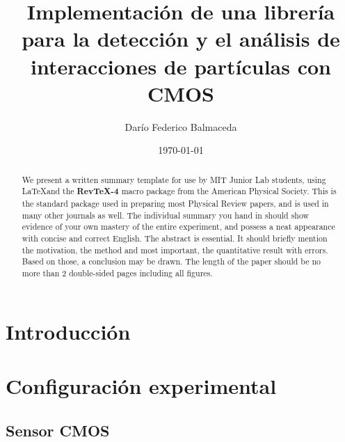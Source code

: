     
    \title{Implementación de una librería para la detección y el análisis de interacciones de partículas con CMOS}
    \author         {Darío Federico Balmaceda}
    \date{\today}
    
    \begin{abstract}
    We present a written summary template for use by MIT Junior Lab
    students, using \LaTeX and the {\bf RevTeX-4} macro package from the
    American Physical Society.  This is the standard package used in
    preparing most Physical Review papers, and is used in many other
    journals as well.  The individual summary you hand in should show
    evidence of your own mastery of the entire experiment, and possess a
    neat appearance with concise and correct English.  The abstract is
    essential.  It should briefly mention the motivation, the method and
    most important, the quantitative result with errors.  Based on those,
    a conclusion may be drawn.  The length of the paper should be no more
    than 2 double-sided pages including all figures.
    \end{abstract}
    
    \maketitle
    
    \section{Introducción}
    
    \section{Configuración experimental}
    
    \subsection{Sensor CMOS}
    
    
